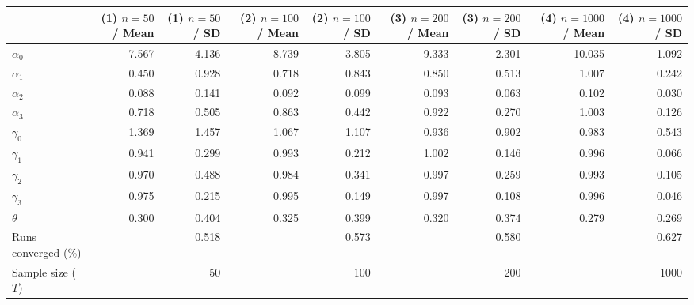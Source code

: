 
\begin{tabular}[t]{lrrrrrrrr}
\toprule
  & (1) $n=50$ / Mean & (1) $n=50$ / SD & (2) $n=100$ / Mean & (2) $n=100$ / SD & (3) $n=200$ / Mean & (3) $n=200$ / SD & (4) $n=1000$ / Mean & (4) $n=1000$ / SD\\
\midrule
$\alpha_{0}$ & 7.567 & 4.136 & 8.739 & 3.805 & 9.333 & 2.301 & 10.035 & 1.092\\
$\alpha_{1}$ & 0.450 & 0.928 & 0.718 & 0.843 & 0.850 & 0.513 & 1.007 & 0.242\\
$\alpha_{2}$ & 0.088 & 0.141 & 0.092 & 0.099 & 0.093 & 0.063 & 0.102 & 0.030\\
$\alpha_{3}$ & 0.718 & 0.505 & 0.863 & 0.442 & 0.922 & 0.270 & 1.003 & 0.126\\
$\gamma_{0}$ & 1.369 & 1.457 & 1.067 & 1.107 & 0.936 & 0.902 & 0.983 & 0.543\\
$\gamma_{1}$ & 0.941 & 0.299 & 0.993 & 0.212 & 1.002 & 0.146 & 0.996 & 0.066\\
$\gamma_{2}$ & 0.970 & 0.488 & 0.984 & 0.341 & 0.997 & 0.259 & 0.993 & 0.105\\
$\gamma_{3}$ & 0.975 & 0.215 & 0.995 & 0.149 & 0.997 & 0.108 & 0.996 & 0.046\\
$\theta$ & 0.300 & 0.404 & 0.325 & 0.399 & 0.320 & 0.374 & 0.279 & 0.269\\
Runs converged (\%) &  & 0.518 &  & 0.573 &  & 0.580 &  & 0.627\\
Sample size ($T$) &  & 50 &  & 100 &  & 200 &  & 1000\\
\bottomrule
\end{tabular}
